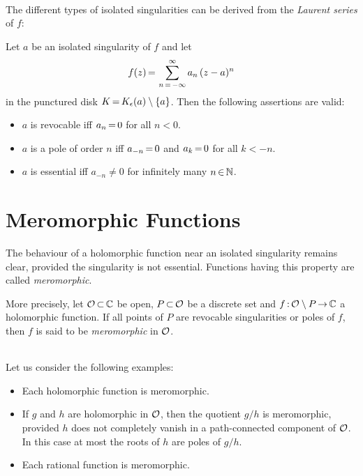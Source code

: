 \documentclass[11pt,twoside]{article}
\begin{document}
\paragraph{}
The different types of isolated singularities can be derived
from the \textit{Laurent series} of $f$:

\begin{theorem}
Let $a$ be an isolated singularity of $f$ and let
\[
f(z) {\,=\,} \sum_{n {\,=\,} -\infty}^{\infty} a_n \, (z-a)^n
\]
in the punctured disk $K {\,=\,} K_{\epsilon}(a) \setminus \{a\}$.
Then the following assertions are valid:

\begin{itemize}[leftmargin=15pt]
\item[1.]
$a$ is revocable iff
$a_n {\,=\,} 0$ for all $n < 0$.
\item[2.]
$a$ is a pole of order $n$ iff
$a_{-n} {\,=\,} 0$ and $a_k {\,=\,} 0$ for all $k < -n$.
\item[3.]
$a$ is essential iff
$a_{-n} \neq 0$ for infinitely many $n {\,\in\,} {\mathbb{N}}$.
\end{itemize}
\end{theorem}

\part{Meromorphic Functions}
The behaviour of a holomorphic function near an isolated singularity
remains clear,
provided the singularity is not essential.
Functions having this property are called \textit{meromorphic}.

\subparagraph{}
More precisely,
let $\mathcal{O} {\,\subset\,} {\mathbb{C}}$ be open,
$P {\,\subset\,} \mathcal{O}$ be a discrete set and
$f {\,:\,} \mathcal{O} \setminus P {\,\to\,} {\mathbb{C}}$ a holomorphic function.
If all points of $P$ are revocable singularities or poles of $f$,
then $f$ is said to be \textit{meromorphic} in $\mathcal{O}$.

\paragraph{}
Let us consider the following examples:

\begin{itemize}[leftmargin=15pt]
\item[1.]
Each holomorphic function is meromorphic.
\item[2.]
If $g$ and $h$ are holomorphic in $\mathcal{O}$,
then the quotient $g/h$ is meromorphic,
provided $h$ does not completely vanish in a path-connected component of $\mathcal{O}$.
In this case at most the roots of $h$ are poles of $g/h$.
\item[3.]
Each rational function is meromorphic.
\end{itemize}
\end{document}
